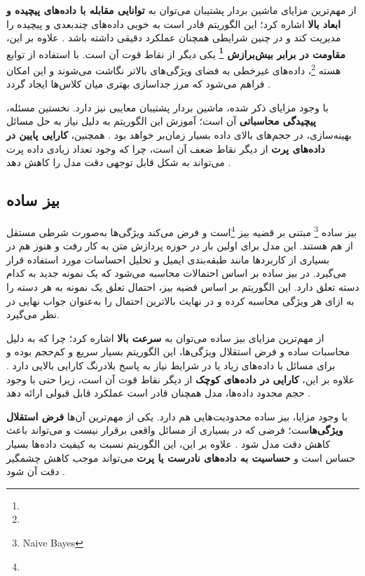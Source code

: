 از مهم‌ترین مزایای ماشین بردار پشتیبان می‌توان به \textbf{توانایی مقابله با داده‌های پیچیده و ابعاد بالا} اشاره کرد؛ این الگوریتم قادر است به خوبی داده‌های چندبعدی و پیچیده را مدیریت کند و در چنین شرایطی همچنان عملکرد دقیقی داشته باشد \cite{vapnik1998statistical}. علاوه بر این، \textbf{مقاومت در برابر بیش‌برازش \footnote{}} یکی دیگر از نقاط قوت آن است. با استفاده از توابع هسته \footnote{}، داده‌های غیرخطی به فضای ویژگی‌های بالاتر نگاشت می‌شوند و این امکان فراهم می‌شود که مرز جداسازی بهتری میان کلاس‌ها ایجاد گردد \cite{cortes1995support}. 

با وجود مزایای ذکر شده، ماشین بردار پشتیبان معایبی نیز دارد. نخستین مسئله، \textbf{پیچیدگی محاسباتی} آن است؛ آموزش این الگوریتم به دلیل نیاز به حل مسائل بهینه‌سازی، در حجم‌های بالای داده بسیار زمان‌بر خواهد بود \cite{murphy2012machine}. همچنین، \textbf{کارایی پایین در داده‌های پرت} از دیگر نقاط ضعف آن است، چرا که وجود تعداد زیادی داده پرت می‌تواند به شکل قابل توجهی دقت مدل را کاهش دهد \cite{bishop2006pattern}.



\subsection{بیز ساده}
بیز ساده \footnote{Naive Bayes} مبتنی بر قضیه بیز \footnote{}است و فرض می‌کند ویژگی‌ها به‌صورت شرطی مستقل از هم هستند\cite{domingos1997optimal,mitchell1997machine}.
این مدل برای اولین بار در حوزه پردازش متن به کار رفت و هنوز هم در بسیاری از کاربردها مانند طبقه‌بندی ایمیل و تحلیل احساسات مورد استفاده قرار می‌گیرد\cite{mccallum1998comparison}. 
در بیز ساده بر اساس احتمالات محاسبه می‌شود که یک نمونه جدید به کدام دسته تعلق دارد. این الگوریتم بر اساس قضیه بیز، احتمال تعلق یک نمونه به هر دسته را به ازای هر ویژگی محاسبه کرده و در نهایت بالاترین احتمال را به‌عنوان جواب نهایی در نظر می‌گیرد\cite{bishop2006pattern}.


از مهم‌ترین مزایای بیز ساده می‌توان به \textbf{سرعت بالا} اشاره کرد؛ چرا که به دلیل محاسبات ساده و فرض استقلال ویژگی‌ها، این الگوریتم بسیار سریع و کم‌حجم بوده و برای مسائل با داده‌های زیاد یا در شرایط نیاز به پاسخ بلادرنگ کارایی بالایی دارد \cite{mccallum1998comparison}. علاوه بر این، \textbf{کارایی در داده‌های کوچک} از دیگر نقاط قوت آن است، زیرا حتی با وجود حجم محدود داده‌ها، مدل همچنان قادر است عملکرد قابل قبولی ارائه دهد \cite{murphy2012machine}.  


با وجود مزایا، بیز ساده محدودیت‌هایی هم دارد. یکی از مهم‌ترین آن‌ها \textbf{فرض استقلال ویژگی‌ها}ست؛ فرضی که در بسیاری از مسائل واقعی برقرار نیست و می‌تواند باعث کاهش دقت مدل شود \cite{domingos1997optimal}. علاوه بر این، این الگوریتم نسبت به کیفیت داده‌ها بسیار حساس است و \textbf{حساسیت به داده‌های نادرست یا پرت} می‌تواند موجب کاهش چشمگیر دقت آن شود \cite{bishop2006pattern}.


